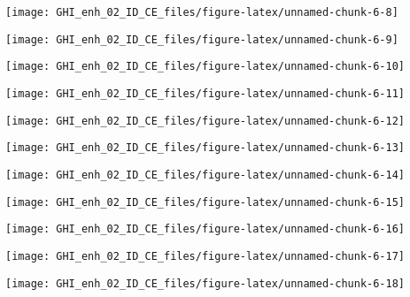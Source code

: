 \documentclass[
  10pt,
  a4paper,oneside]{article}
\begin{document}
\begin{center}\texttt{[image: GHI\_enh\_02\_ID\_CE\_files/figure-latex/unnamed-chunk-6-8]} \end{center}

\begin{center}\texttt{[image: GHI\_enh\_02\_ID\_CE\_files/figure-latex/unnamed-chunk-6-9]} \end{center}

\begin{center}\texttt{[image: GHI\_enh\_02\_ID\_CE\_files/figure-latex/unnamed-chunk-6-10]} \end{center}

\begin{center}\texttt{[image: GHI\_enh\_02\_ID\_CE\_files/figure-latex/unnamed-chunk-6-11]} \end{center}

\begin{center}\texttt{[image: GHI\_enh\_02\_ID\_CE\_files/figure-latex/unnamed-chunk-6-12]} \end{center}

\begin{center}\texttt{[image: GHI\_enh\_02\_ID\_CE\_files/figure-latex/unnamed-chunk-6-13]} \end{center}

\begin{center}\texttt{[image: GHI\_enh\_02\_ID\_CE\_files/figure-latex/unnamed-chunk-6-14]} \end{center}

\begin{center}\texttt{[image: GHI\_enh\_02\_ID\_CE\_files/figure-latex/unnamed-chunk-6-15]} \end{center}

\begin{center}\texttt{[image: GHI\_enh\_02\_ID\_CE\_files/figure-latex/unnamed-chunk-6-16]} \end{center}

\begin{center}\texttt{[image: GHI\_enh\_02\_ID\_CE\_files/figure-latex/unnamed-chunk-6-17]} \end{center}

\begin{center}\texttt{[image: GHI\_enh\_02\_ID\_CE\_files/figure-latex/unnamed-chunk-6-18]} \end{center}
\end{document}

